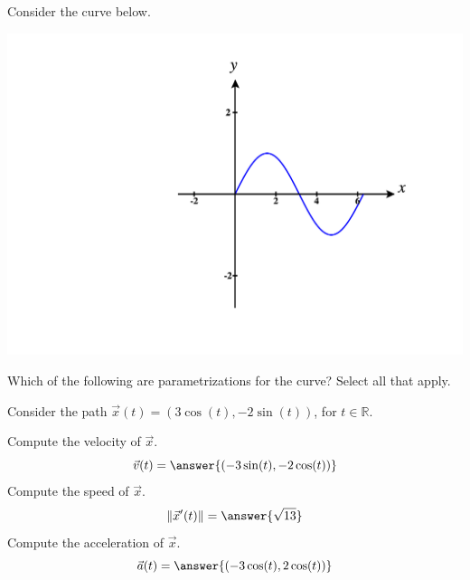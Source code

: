 \documentclass{ximera}
\begin{document}
\begin{problem}
Consider the curve below.

\begin{image}\includegraphics[width =\textwidth]{CalcPlot3D-sine_curve}\end{image}

Which of the following are parametrizations for the curve? Select all that apply.
\begin{selectAll}
\end{selectAll}
\end{problem}

\begin{problem}
Consider the path $\vec{x}(t) = (3\cos(t), -2\sin(t))$, for $t\in\mathbb{R}$.

Compute the velocity of $\vec{x}$.
\[
\vec{v}(t) = \answer{(-3\sin(t), -2\cos(t))}
\]
Compute the speed of $\vec{x}$.
\[
\|\vec{x}'(t)\| = \answer{\sqrt{13}}
\]
Compute the acceleration of $\vec{x}$.
\[
\vec{a}(t) = \answer{(-3\cos(t), 2\cos(t))}
\]
\end{problem}
\end{document}
